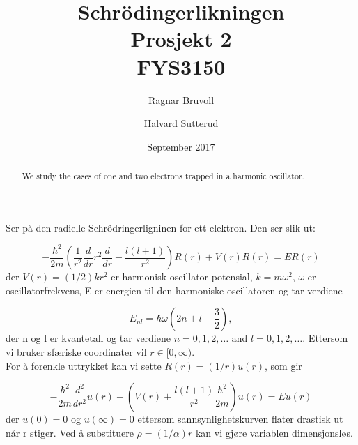 \documentclass[12pt]{article}
\begin{document}
\title{Schrödingerlikningen
\\ Prosjekt 2
\\ FYS3150}
\author{Ragnar Bruvoll \and Halvard Sutterud}
\date{September 2017}
\maketitle{\begin{center}\end{center}}
\thispagestyle{empty}

\begin{abstract}
    We study the cases of one and two electrons trapped in a harmonic oscillator. 

\end{abstract}
\newpage
{}




Ser på den radielle Schrôdringerligninen for ett elektron. Den ser slik ut:

\begin{equation*}
  -\frac{\hbar^2}{2 m} \left ( \frac{1}{r^2} \frac{d}{dr} r^2
  \frac{d}{dr} - \frac{l (l + 1)}{r^2} \right )R(r) 
     + V(r) R(r) = E R(r)
\end{equation*}
der  $V(r) = (1/2)kr^2$ er harmonisk oscillator potensial, $k=m\omega^2$,
$\omega$ er oscillatorfrekvens, E er energien til den harmoniske
oscillatoren og tar verdiene

\begin{equation*}
E_{nl}=  \hbar \omega \left(2n+l+\frac{3}{2}\right),
\end{equation*}
der n og l er kvantetall og tar verdiene $n=0,1,2,\dots$ and
$l=0,1,2,\dots$. Ettersom vi bruker sfæriske coordinater vil $r\in
[0,\infty)$.\\

For å forenkle uttrykket kan vi sette $R(r) = (1/r) u(r)$, som gir

\begin{equation*}
  -\frac{\hbar^2}{2 m} \frac{d^2}{dr^2} u(r) + \left ( V(r) + \frac{l (l + 1)}{r^2}\frac{\hbar^2}{2 m}\right ) u(r)  = E u(r)
\end{equation*}
der $u(0)=0$ og $u(\infty)=0$ ettersom sannsynlighetskurven flater drastisk
ut når r stiger. Ved å substituere $\rho = (1/\alpha) r$ kan vi gjøre
variablen dimensjonsløs.
\end{document}
